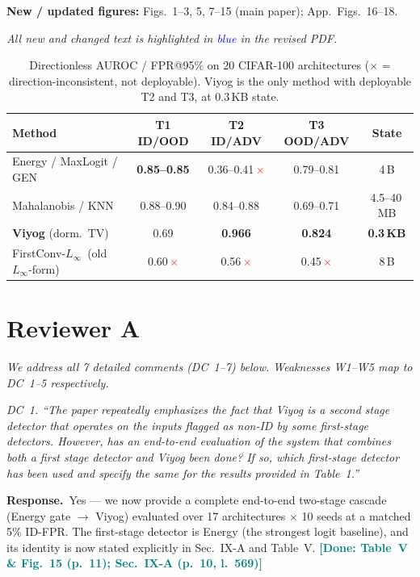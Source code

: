 \documentclass[10pt,letterpaper,journal]{IEEEtran}
\newcommand{\rc}[1]{\smallskip\noindent\textit{\textcolor{black!75}{#1}}\par\smallskip}
\newcommand{\rr}{\noindent\textbf{Response.}~}
\newcommand{\Linf}{$L_\infty$}
\newcommand{\xmark}{\textcolor{red}{\ensuremath{\times}}}
\newcommand{\done}[1]{\textcolor{teal}{\textbf{[Done: #1]}}}
\begin{document}
\smallskip
\noindent\textbf{New / updated figures:}
Figs.~1--3, 5, 7--15 (main paper); App.~Figs.~16--18.

\smallskip
\noindent\textit{All new and changed text is highlighted in \textcolor{blue}{blue} in the revised PDF.}

\begin{table}[t]\centering\footnotesize\setlength{\tabcolsep}{1.5pt}
\caption{Directionless AUROC / FPR@95\% on 20 CIFAR-100 architectures ($\times$ =
direction-inconsistent, not deployable). Viyog is the only method with
deployable T2 and T3, at $0.3$\,KB state.}
\begin{tabular}{@{}lcccc@{}}
\toprule
Method & T1 ID/OOD & T2 ID/ADV & T3 OOD/ADV & State \\\midrule
Energy / MaxLogit / GEN & \textbf{0.85--0.85} & 0.36--0.41\,\xmark & 0.79--0.81 & 4\,B \\
Mahalanobis / KNN & 0.88--0.90 & 0.84--0.88 & 0.69--0.71 & 4.5--40\,MB \\
\rowcolor{teal!12}\textbf{Viyog} (dorm.\ TV) & 0.69 & \textbf{0.966} & \textbf{0.824} & \textbf{0.3\,KB} \\
FirstConv-\Linf\ (old $L_\infty$-form) & 0.60\,\xmark & 0.56\,\xmark & 0.45\,\xmark & 8\,B \\
\bottomrule
\end{tabular}
\end{table}


\section*{Reviewer A}
\noindent\textit{We address all 7 detailed comments
(DC~1--7) below. Weaknesses W1--W5 map to DC~1--5 respectively.}

\rc{DC~1. ``The paper repeatedly emphasizes the fact that Viyog is a second stage
detector that operates on the inputs flagged as non-ID by some first-stage
detectors. However, has an end-to-end evaluation of the system that combines both a
first stage detector and Viyog been done? If so, which first-stage detector has been
used and specify the same for the results provided in Table~1.''}

\rr Yes --- we now provide a complete end-to-end two-stage cascade (Energy gate
$\to$ Viyog) evaluated over 17 architectures $\times$ 10 seeds at a matched
5\% ID-FPR. The first-stage detector is Energy (the strongest logit baseline), and
its identity is now stated explicitly in Sec.~IX-A and Table~V.
\done{Table~V \& Fig.~15 (p.~11); Sec.~IX-A (p.~10, l.~569)}
\end{document}
